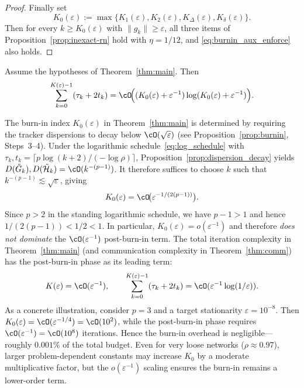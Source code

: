\documentclass[review,onefignum,onetabnum]{siamart171218}
\begin{document}
\begin{proof}
\smallskip
Finally set
\[
K_0(\varepsilon):=\max\{K_1(\varepsilon),K_2(\varepsilon),K_\Delta(\varepsilon),K_\delta(\varepsilon)\}.
\]
Then for every $k\ge K_0(\varepsilon)$ with $\|g_k\|\ge \varepsilon$, all three items of Proposition~\ref{prop:inexact-rn} hold with $\eta=1/12$,
and \eqref{eq:burnin_aux_enforce} also holds.
\end{proof}

\begin{theorem}\label{thm:comm}
Assume the hypotheses of Theorem~\ref{thm:main}. Then
\[
\sum_{k=0}^{K(\varepsilon)-1}(\tau_k+2t_k)
=\cO\!\Big((K_0(\varepsilon)+\varepsilon^{-1})\log(K_0(\varepsilon)+\varepsilon^{-1})\Big).
\]
\end{theorem}

\begin{remark}\label{rem:burnin_order_app}
The burn-in index $K_0(\varepsilon)$ in Theorem~\ref{thm:main} is
determined by requiring the tracker dispersions to decay below
$\cO(\sqrt\varepsilon)$ (see Proposition~\ref{prop:burnin}, Steps~3--4).
Under the logarithmic schedule~\eqref{eq:log_schedule} with
$\tau_k,t_k=\lceil p\log(k+2)/(-\log\rho)\rceil$,
Proposition~\ref{prop:dispersion_decay} yields
$D(\tilde G_k),D(\tilde{\mathcal H}_k)=\cO(k^{-(p-1)})$.
It therefore suffices to choose $k$ such that $k^{-(p-1)}\lesssim\sqrt\varepsilon$,
giving
\[
K_0(\varepsilon)=\cO\!\big(\varepsilon^{-1/(2(p-1))}\big).
\]
Since $p>2$ in the standing logarithmic schedule, we have $p-1>1$
and hence $1/(2(p-1))<1/2<1$.
In particular, $K_0(\varepsilon)=o(\varepsilon^{-1})$ and therefore
\emph{does not dominate} the $\cO(\varepsilon^{-1})$ post-burn-in term.
The total iteration complexity in Theorem~\ref{thm:main}
(and communication complexity in Theorem~\ref{thm:comm}) has the
post-burn-in phase as its leading term:
\[
K(\varepsilon)=\cO(\varepsilon^{-1}),
\qquad
\sum_{k=0}^{K(\varepsilon)-1}(\tau_k+2t_k)
=\cO(\varepsilon^{-1}\log(1/\varepsilon)).
\]
As a concrete illustration, consider $p=3$ and a target stationarity
$\varepsilon=10^{-8}$.
Then $K_0(\varepsilon)=\cO(\varepsilon^{-1/4})=\cO(10^{2})$,
while the post-burn-in phase requires $\cO(\varepsilon^{-1})=\cO(10^{8})$
iterations.
Hence the burn-in overhead is negligible---roughly $0.001\%$
of the total budget.
Even for very loose networks ($\rho\approx0.97$), larger
problem-dependent constants may increase $K_0$ by a moderate
multiplicative factor, but the $o(\varepsilon^{-1})$ scaling ensures
the burn-in remains a lower-order term.
\end{remark}
\end{document}
